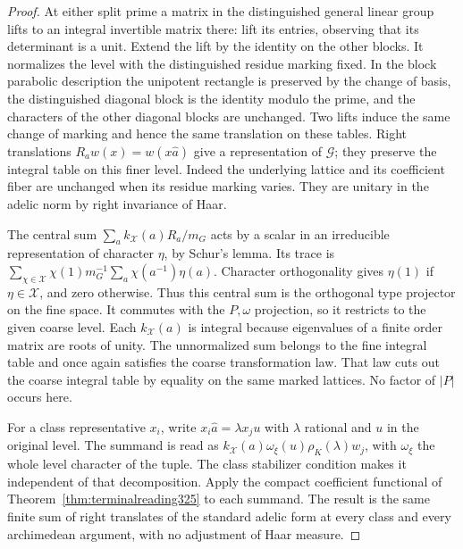 \documentclass[a4paper,11pt]{article}
\theoremstyle{definition}
\theoremstyle{remark}
\numberwithin{equation}{section}
\begin{document}
\begin{proof}
At either split prime a matrix in the distinguished general linear
group lifts to an integral invertible matrix there: lift its
entries, observing that its determinant is a unit. Extend the lift
by the identity on the other blocks. It normalizes the level with
the distinguished residue marking fixed. In the block parabolic
description the unipotent rectangle is preserved by the change
of basis, the distinguished diagonal block is the identity
modulo the prime, and the characters of the other diagonal
blocks are unchanged. Two lifts induce the same change of
marking and hence the same translation on these tables. Right
translations \(R_a w(x)=w(x\widehat a)\) give a representation
of \(\mathcal G\); they preserve the integral table on this finer
level. Indeed the underlying lattice and its coefficient fiber
are unchanged when its residue marking varies. They are unitary
in the adelic norm by right invariance of Haar.

The central sum \(\sum_a k_{\mathcal X}(a)R_a/m_G\) acts by a
scalar in an irreducible representation of character \(\eta\),
by Schur's lemma. Its trace is
\(\sum_{\chi\in\mathcal X}\chi(1)m_G^{-1}
   \sum_a\chi(a^{-1})\eta(a)\).
Character orthogonality gives \(\eta(1)\) if
\(\eta\in\mathcal X\), and zero otherwise. Thus this central
sum is the orthogonal type projector on the fine space. It
commutes with the \(P,\omega\) projection, so it restricts to
the given coarse level. Each \(k_{\mathcal X}(a)\) is integral
because eigenvalues of a finite order matrix are roots of
unity. The unnormalized sum belongs to the fine integral
table and once again satisfies the coarse transformation law.
That law cuts out the coarse integral table by equality on
the same marked lattices. No factor of \(|P|\) occurs here.

For a class representative \(x_i\), write
\(x_i\widehat a=\lambda x_j u\) with \(\lambda\) rational and
\(u\) in the original level. The summand is read as
\(k_{\mathcal X}(a)\omega_\xi(u)\rho_K(\lambda)w_j\), with
\(\omega_\xi\) the whole level character of the tuple.
The class stabilizer condition makes it independent of that
decomposition. Apply the compact coefficient functional of
Theorem~\ref{thm:terminalreading325} to each summand. The
result is the same finite sum of right translates of the
standard adelic form at every class and every archimedean
argument, with no adjustment of Haar measure.


\end{proof}
\end{document}
